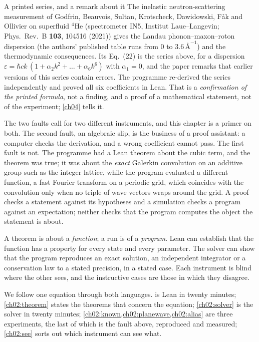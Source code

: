 \begin{godfrinbox}{A printed series, and a remark about it}
The inelastic neutron-scattering measurement of Godfrin, Beauvois, Sultan, Krotscheck, Dawidowski, F\aa k and Ollivier on superfluid $^4$He
(spectrometer IN5, Institut Laue--Langevin; Phys.\ Rev.\ B \textbf{103}, 104516 (2021)) gives the Landau phonon--maxon--roton dispersion (the authors' published table runs
from $0$ to $3.6\,\text{\AA}^{-1}$) and the thermodynamic consequences. Its Eq.~(22) is the series above, for a dispersion
$\varepsilon=\hbar ck\,(1+\alpha_2k^2+\dots+\alpha_6k^6)$ with $\alpha_1=0$, and the paper remarks that earlier versions of this series contain errors.
The programme re-derived the series independently and proved all six coefficients in Lean. That is a \emph{confirmation of the printed formula},
not a finding, and a proof of a mathematical statement, not of the experiment; \cref{ch04} tells it.
\end{godfrinbox}

The two faults call for two different instruments, and this chapter is a primer on both. The second fault, an algebraic slip, is the business of a
proof assistant: a computer checks the derivation, and a wrong coefficient cannot pass. The first fault is not. The programme had a Lean theorem about the
cubic term, and the theorem was true; it was about the \emph{exact} Galerkin convolution on an additive group such as the integer lattice, while the program evaluated a
different function, a fast Fourier transform on a periodic grid, which coincides with the convolution only when no triple of wave vectors wraps around the
grid. A proof checks a statement against its hypotheses and a simulation checks a program against an expectation; neither checks that the program computes
the object the statement is about.

\begin{keybox}
A theorem is about a \emph{function}; a run is of a \emph{program}. Lean can establish that the function has a property for every state and every
parameter. The solver can show that the program reproduces an exact solution, an independent integrator or a conservation law to a stated precision, in a stated
case. Each instrument is blind where the other sees, and the instructive cases are those in which they disagree.
\end{keybox}

We follow one equation through both languages.  is Lean in twenty minutes; \cref{ch02:theorem} states the theorems that concern the
equation; \cref{ch02:solver} is the solver in twenty minutes; \cref{ch02:known,ch02:planewave,ch02:alias} are three experiments, the last of
which is the fault above, reproduced and measured; \cref{ch02:see} sorts out which instrument can see what.

